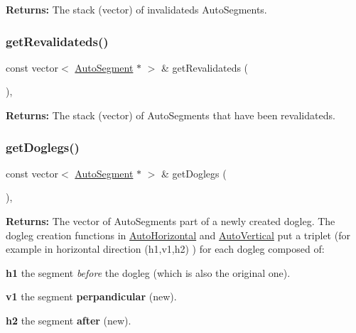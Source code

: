 {\bfseries Returns\+:} The stack (vector) of invalidateds Auto\+Segments. \mbox{\label{classKatabatic_1_1Session_af5675d50557db83d11b7d2151de5f34c}} 
\subsubsection{\texorpdfstring{get\+Revalidateds()}{getRevalidateds()}}
{\footnotesize\ttfamily const vector$<$ \hyperlink{classKatabatic_1_1AutoSegment}{Auto\+Segment} $\ast$ $>$ \& get\+Revalidateds (\begin{DoxyParamCaption}{ }\end{DoxyParamCaption})\hspace{0.3cm}{\ttfamily [inline]}, {\ttfamily [static]}}

{\bfseries Returns\+:} The stack (vector) of Auto\+Segments that have been revalidateds. \mbox{\label{classKatabatic_1_1Session_a84211b77fe7fb8b49a93d7f298a5de90}} 
\subsubsection{\texorpdfstring{get\+Doglegs()}{getDoglegs()}}
{\footnotesize\ttfamily const vector$<$ \hyperlink{classKatabatic_1_1AutoSegment}{Auto\+Segment} $\ast$ $>$ \& get\+Doglegs (\begin{DoxyParamCaption}{ }\end{DoxyParamCaption})\hspace{0.3cm}{\ttfamily [inline]}, {\ttfamily [static]}}

{\bfseries Returns\+:} The vector of Auto\+Segments part of a newly created dogleg. The dogleg creation functions in \hyperlink{classKatabatic_1_1AutoHorizontal}{Auto\+Horizontal} and \hyperlink{classKatabatic_1_1AutoVertical}{Auto\+Vertical} put a triplet (for example in horizontal direction {\ttfamily }(h1,v1,h2) ) for each dogleg composed of\+:
\begin{DoxyItemize}
\item {\bfseries h1} the segment {\itshape before} the dogleg (which is also the original one).
\item {\bfseries v1} the segment {\bfseries perpandicular} (new).
\item {\bfseries h2} the segment {\bfseries after} (new). 
\end{DoxyItemize}

